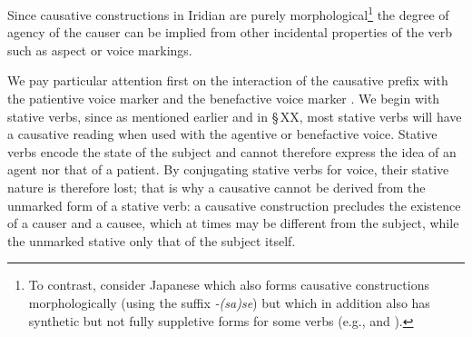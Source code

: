 Since causative constructions in Iridian are purely morphological\footnote{To contrast, consider Japanese which also forms causative constructions morphologically (using the suffix \emph{-(sa)se}) but which in addition also has synthetic but not fully suppletive forms for some verbs (e.g.,  and ).} the degree of agency of the causer can be implied from other incidental properties of the verb such as aspect or voice markings.

We pay particular attention first on the interaction of the causative prefix  with the patientive voice marker  and the benefactive voice marker . We begin with stative verbs, since as mentioned earlier and in \S\,XX, most stative verbs will have a causative reading when used with the agentive or benefactive voice. Stative verbs encode the state of the subject and cannot therefore express the idea of an agent nor that of a patient. By conjugating stative verbs for voice, their stative nature is therefore lost; that is why a causative cannot be derived from the unmarked form of a stative verb: a causative construction precludes the existence of a causer and a causee, which at times may be different from the subject, while the unmarked stative only that of the subject itself.


